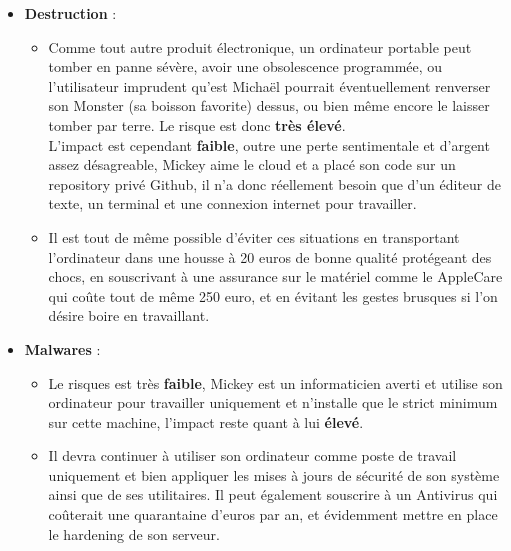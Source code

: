 \documentclass[a4paper,10pt,final,fleqn]{article}
\begin{document}
\begin{enumerate}
\begin{itemize}
							\item \textbf{Destruction} :  \\

								\begin{itemize}
									\item Comme tout autre produit électronique, un ordinateur portable peut tomber en panne sévère, avoir une obsolescence programmée, ou l'utilisateur imprudent qu'est Michaël pourrait éventuellement renverser son Monster (sa boisson favorite) dessus, ou bien même encore le laisser tomber par terre. Le risque est donc \textbf{très élevé}.\\
									L'impact est cependant \textbf{faible}, outre une perte sentimentale et d'argent assez désagreable, Mickey aime le cloud et a placé son code sur un repository privé Github, il n'a donc réellement besoin que d'un éditeur de texte, un terminal et une connexion internet pour travailler.\\
									\item Il est tout de même possible d'éviter ces situations en transportant l'ordinateur dans une housse à 20 euros de bonne qualité protégeant des chocs, en souscrivant à une assurance sur le matériel comme le AppleCare qui coûte tout de même 250 euro, et en évitant les gestes brusques si l'on désire boire en travaillant.\\
								\end{itemize}

							\item \textbf{Malwares} :  \\

								\begin{itemize}
									\item Le risques est très \textbf{faible}, Mickey est un informaticien averti et utilise son ordinateur pour travailler uniquement et n'installe que le strict minimum sur cette machine, l'impact reste quant à lui \textbf{élevé}.\\
									\item Il devra continuer à utiliser son ordinateur comme poste de travail uniquement et bien appliquer les mises à jours de sécurité de son système ainsi que de ses utilitaires. Il peut également souscrire à un Antivirus qui coûterait une quarantaine d'euros par an, et évidemment mettre en place le hardening de son serveur.\\
								\end{itemize}							

						\end{itemize}
						

\end{enumerate}
\end{document}
